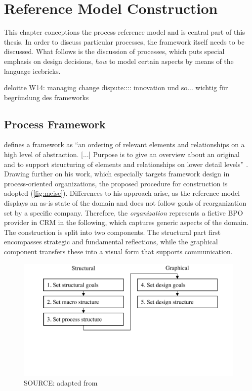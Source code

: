 
\chapter{Reference Model Construction}

This chapter conceptions the process reference model and is central part of this thesis. In order to discuss particular processes, the framework itself needs to be discussed. What follows is the discussion of processes, which puts special emphasis on design decisions, \viz \textit{how} to model certain aspects by means of the language icebricks. 

	deloitte W14: managing change dispute:::: innovation und so... wichtig für begründung des frameworks
	\section{Process Framework}
	
	\citeauthor{Meise2001} defines a framework as \enquote{an ordering of relevant elements and relationships on a high level of abstraction. [...] Purpose is to give an overview about an original and to support structuring of elements and relationships on lower detail levels} \citep[]{Meise2001}. Drawing further on his work, which especially targets framework design in process-oriented organizations, the proposed procedure for construction is adopted (\Fig \ref{fig:meise}). Differences to his approach arise, as the reference model displays an as-is state of the domain and does not follow goals of reorganization set by a specific company. Therefore, the \textit{organization} represents a fictive BPO provider in CRM in the following, which captures generic aspects of the domain. The construction is split into two components. The structural part first encompasses strategic and fundamental reflections, while the graphical component transfers these into a visual form that supports communication.

	\begin{figure}[caption={procedure for framework construction}, label={fig:meise}]
		{	\includegraphics[width=.8\textwidth]{figures/framework-meise.pdf}}
		\hspace{6.2cm}	SOURCE:  adapted from \citep[]{Meise2001}
	\end{figure} 
	
